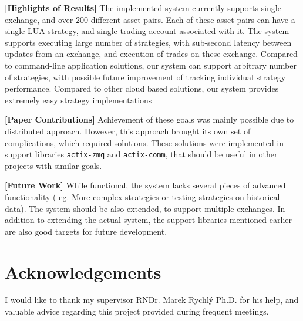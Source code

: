 \documentclass{ExcelAtFIT}
\begin{document}
    \textbf{[Highlights of Results]}
    The implemented system currently supports single exchange, and over 200 different asset pairs. Each of these
    asset pairs can have a single LUA strategy, and single trading account associated with it.
    The system supports executing large number of strategies, with sub-second latency between updates from an exchange, and
    execution of trades on these exchange. Compared to command-line application solutions, our system can support arbitrary number of
    strategies, with possible future improvement of tracking individual strategy performance. Compared to other cloud based solutions,
    our system provides extremely easy strategy implementations

    \textbf{[Paper Contributions]}
    Achievement of these goals was mainly possible due to distributed approach. However, this approach brought its own set of complications,
    which required solutions. These solutions were implemented in support libraries \verb|actix-zmq| and \verb|actix-comm|, that should
    be useful in other projects with similar goals.

    \textbf{[Future Work]}
    While functional, the system lacks several pieces of advanced functionality ( eg. More complex strategies or testing strategies on historical data).
    The system should be also extended, to support multiple exchanges. In addition to extending the actual system, the support libraries mentioned earlier
    are also good targets for future development.
    \section*{Acknowledgements}
    I would like to thank my supervisor RNDr. Marek Rychlý Ph.D. for his help, and valuable advice regarding this project provided during frequent meetings.

    
    
\end{document}
